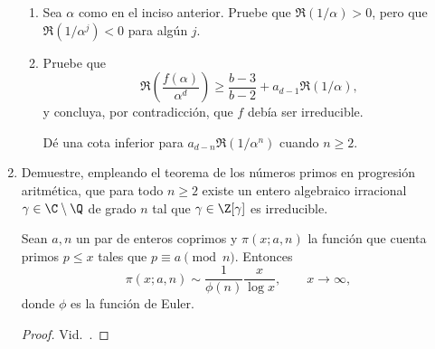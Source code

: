 \documentclass[11pt, reqno]{amsart}
\begin{document}
\begin{enumerate}
\begin{enumerate}
			\item Sea $\alpha$ como en el inciso anterior.
				Pruebe que $\Re(1/\alpha) > 0$, pero que $\Re(1/\alpha^j) < 0$ para algún $j$. 

			\item Pruebe que
				\[
					\Re\mathopen{}\left( \frac{f(\alpha)}{\alpha^d} \right) \ge \frac{b-3}{b-2} + a_{d-1} \Re(1/\alpha),
				\]
				y concluya, por contradicción, que $f$ debía ser irreducible.

				\begin{hint}
					Dé una cota inferior para $a_{d-n} \Re(1/\alpha^n)$ cuando $n \ge 2$.
				\end{hint}

		\end{enumerate}
		\nocite{granville:masterclass}

		\newex
	\item
		Demuestre, empleando el teorema de los números primos en progresión aritmética, que para todo $n \ge 2$ existe un entero
		algebraico irracional $\gamma \in \C \setminus \Q$ de grado $n$ tal que $\gamma \in \Z[\gamma]$ es irreducible.

		\begin{thm}
			Sean $a, n$ un par de enteros coprimos y $\pi(x; a, n)$ la función que cuenta primos $p \le x$ tales que $p \equiv a
			\pmod n$.
			Entonces
			\[
				\pi(x; a, n) \sim \frac{1}{\phi(n)} \frac{x}{\log x}, \qquad x \to \infty,
			\]
			donde $\phi$ es la función de Euler.
		\end{thm}
		\begin{additional}
			\begin{proof}
				Vid.\ \cite[361]{tenenbaum:analytique}.
			\end{proof}
		\end{additional}
\end{enumerate}

\begin{additional}
\newpage
\printbibliography[title={Referencias y lecturas adicionales}]
\end{additional}
\end{document}
